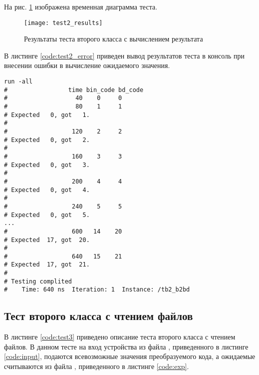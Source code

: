 На рис. \ref{fig:test2_results} изображена временная диаграмма теста.
\vspace{-0.5cm}
\begin{figure}[H]
	\begin{center}
		\texttt{[image: test2\_results]}
		\caption{Результаты теста второго класса с вычислением результата}
		\label{fig:test2_results}
	\end{center}
\end{figure}
\vspace{-1cm}

В листинге \ref{code:test2_error} приведен вывод результатов теста в консоль при внесении ошибки в вычисление ожидаемого значения.	
\begin{lstlisting}[caption=Результаты ошибочного теста второго класса с вычислением результата, label=code:test2_error, style=console]
run -all
# 		          time bin_code bd_code
#                   40    0     0
#                   80    1     1
# Expected   0, got   1.
# 
#                  120    2     2
# Expected   0, got   2.
# 
#                  160    3     3
# Expected   0, got   3.
# 
#                  200    4     4
# Expected   0, got   4.
# 
#                  240    5     5
# Expected   0, got   5.
...
#                  600   14    20
# Expected  17, got  20.
# 
#                  640   15    21
# Expected  17, got  21.
# 
# Testing complited
#    Time: 640 ns  Iteration: 1  Instance: /tb2_b2bd
\end{lstlisting}
\vspace{-0.5cm}

\subsection{Тест второго класса с чтением файлов}

В листинге \ref{code:test3} приведено описание теста второго класса с чтением файлов. В данном тесте на вход устройства из файла , приведенного в листинге \ref{code:input}, подаются всевозможные значения преобразуемого кода, а ожидаемые считываются из файла , приведенного в листинге \ref{code:exp}. 

\newpage
\begin{multicols}{2}
		
	
\end{multicols}

